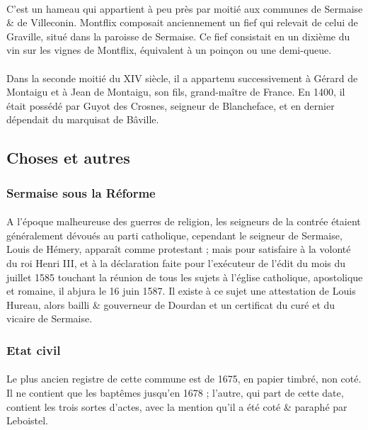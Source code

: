 \documentclass[../eBook.tex]{subfiles}
\begin{document}
      \paragraph{}C'est un hameau qui appartient à peu près par moitié aux communes de Sermaise \& de Villeconin. Montflix composait anciennement un fief qui relevait de celui de Graville, situé dans la paroisse de Sermaise. Ce fief consistait en un dixième du vin sur les vignes de Montflix, équivalent  à un poinçon ou une demi-queue.
      \paragraph{}Dans la seconde moitié du XIV siècle, il a appartenu successivement à Gérard de Montaigu et à Jean de Montaigu, son fils, grand-maître de France. En 1400, il était possédé par Guyot des Crosnes, seigneur de Blancheface, et en dernier dépendait du marquisat de Bâville.

  \subsection*{Choses et autres}
    \subsubsection*{Sermaise sous la Réforme}
      \paragraph{}A l'époque malheureuse des guerres de religion, les seigneurs de la contrée étaient généralement dévoués au parti catholique, cependant le seigneur de Sermaise, Louis de Hémery, apparaît comme protestant ; mais pour satisfaire à la volonté du roi Henri III, et à la déclaration faite pour l'exécuteur de l'édit du mois du juillet 1585 touchant la réunion de tous les sujets à l'église catholique, apostolique et romaine, il abjura le 16 juin 1587. Il existe à ce sujet une attestation de Louis Hureau, alors bailli \& gouverneur de Dourdan et un certificat du curé et du vicaire de Sermaise.

    \subsubsection*{Etat civil}
      \paragraph{}Le plus ancien registre de cette commune est de 1675, en papier timbré, non coté. Il ne contient que les baptêmes jusqu'en 1678 ; l'autre, qui part de cette date, contient les trois sortes d'actes, avec la mention qu'il a été coté \& paraphé par Leboistel.
\end{document}
